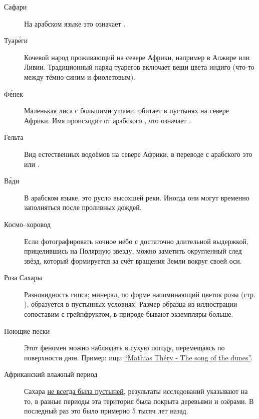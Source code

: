 \documentclass[a5paper,11pt]{memoir}
\begin{document}
\begin{description}
\item[Сафари] На арабском языке это означает .

\item[Туар\'{е}ги] Кочевой народ проживающий на севере Африки, например в Алжире или Ливии. Традиционный наряд туарегов включает вещи цвета индиго (что-то между тёмно-синим и фиолетовым).


\item[Ф\'{е}нек] Маленькая лиса с большими ушами, обитает в пустынях на севере Африки. Имя происходит от арабского , что означает . 

\item[Гельта] Вид естественных водоёмов на севере Африки, в переводе с арабского это  или .

\item[В\'{а}ди] В арабском языке, это русло высохшей реки. Иногда они могут временно заполняться после проливных дождей.

\item[Космо--хоровод] Если фотографировать ночное небо с достаточно длительной выдержкой, прицелившись на Полярную звезду, можно заметить округленный след звёзд, который формируется за счёт вращения Земли вокруг своей оси.

\item[Роза Сахары] Разновидность гипса; минерал, по форме напоминающий цветок розы (стр. \pageref{fig:desert-rose}), образуется в пустынных условиях. Размер образца из иллюстрации сопоставим с грейпфруктом, в природе бывают экземпляры больше.


\item[Поющие пески] Этот феномен можно наблюдать в сухую погоду, перемещаясь по поверхности дюн. Пример: ищи \href{https://youtu.be/4yFaMsUawi4}{``Mathias Th\'ery - The song of the dunes''}.

\item[Африканский влажный период] Сахара \href{https://ru.wikipedia.org/wiki/%D0%A1%D0%B0%D1%85%D0%B0%D1%80%D0%B0#%D0%98%D1%81%D1%82%D0%BE%D1%80%D0%B8%D1%8F}{не всегда была пустыней}, результаты исследований указывают на то, в разные периоды эта територия была покрыта деревьями и озёрами. В последный раз это было примерно 5 тысяч лет назад.
\end{description}
\end{document}
